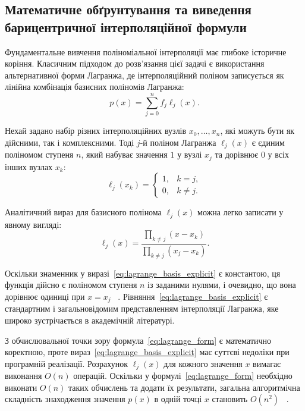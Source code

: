 \subsection{Математичне обґрунтування та виведення барицентричної інтерполяційної формули}

Фундаментальне вивчення поліноміальної інтерполяції має глибоке історичне коріння. Класичним підходом до розв'язання цієї задачі є використання альтернативної форми Лагранжа, де інтерполяційний поліном записується як лінійна комбінація базисних поліномів Лагранжа:
\begin{equation}\label{eq:lagrange_form}
	p(x) = \sum_{j=0}^{n} f_j \ell_j(x).
\end{equation}

Нехай задано набір різних інтерполяційних вузлів $x_0, \dots, x_n$, які можуть бути як дійсними, так і комплексними. Тоді $j$-й поліном Лагранжа $\ell_j(x)$ є єдиним поліномом ступеня $n$, який набуває значення $1$ у вузлі $x_j$ та дорівнює $0$ у всіх інших вузлах $x_k$:
\begin{equation}\label{eq:lagrange_basis_def}
	\ell_j(x_k) = 
	\begin{cases} 
		1, & k = j, \\ 
		0, & k \neq j. 
	\end{cases}
\end{equation}

Аналітичний вираз для базисного полінома $\ell_j(x)$ можна легко записати у явному вигляді:
\begin{equation}\label{eq:lagrange_basis_explicit}
	\ell_j(x) = \frac{\prod_{k \neq j} (x - x_k)}{\prod_{k \neq j} (x_j - x_k)}.
\end{equation}

Оскільки знаменник у виразі~\eqref{eq:lagrange_basis_explicit} є константою, ця функція дійсно є поліномом ступеня $n$ із заданими нулями, і очевидно, що вона дорівнює одиниці при $x = x_j$ ~\cite{trefethen2013approximation}. Рівняння~\eqref{eq:lagrange_basis_explicit} є стандартним і загальновідомим представленням інтерполяції Лагранжа, яке широко зустрічається в академічній літературі.

З обчислювальної точки зору формула~\eqref{eq:lagrange_form} є математично коректною, проте вираз~\eqref{eq:lagrange_basis_explicit} має суттєві недоліки при програмній реалізації. Розрахунок $\ell_j(x)$ для кожного значення $x$ вимагає виконання $O(n)$ операцій. Оскільки у формулі~\eqref{eq:lagrange_form} необхідно виконати $O(n)$ таких обчислень та додати їх результати, загальна алгоритмічна складність знаходження значення $p(x)$ в одній точці $x$ становить $O(n^2)$ ~\cite{trefethen2013approximation}.

